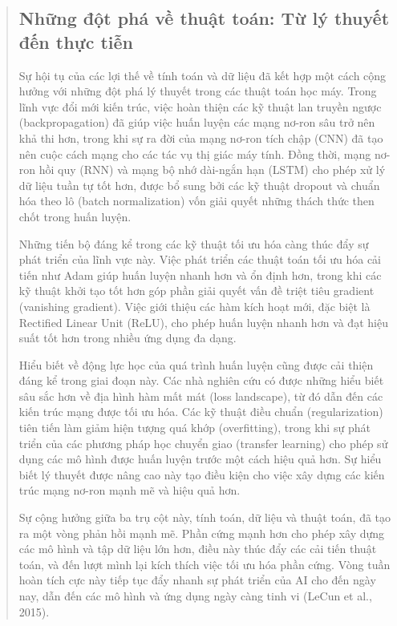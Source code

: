 \begin{quote}
\subsection{Những đột phá về thuật toán: Từ lý thuyết đến thực tiễn}

Sự hội tụ của các lợi thế về tính toán và dữ liệu đã kết hợp một cách cộng hưởng với những đột phá lý thuyết trong các thuật toán học máy. Trong lĩnh vực đổi mới kiến trúc, việc hoàn thiện các kỹ thuật lan truyền ngược (backpropagation) đã giúp việc huấn luyện các mạng nơ-ron sâu trở nên khả thi hơn, trong khi sự ra đời của mạng nơ-ron tích chập (CNN) đã tạo nên cuộc cách mạng cho các tác vụ thị giác máy tính. Đồng thời, mạng nơ-ron hồi quy (RNN) và mạng bộ nhớ dài-ngắn hạn (LSTM) cho phép xử lý dữ liệu tuần tự tốt hơn, được bổ sung bởi các kỹ thuật dropout và chuẩn hóa theo lô (batch normalization) vốn giải quyết những thách thức then chốt trong huấn luyện.

Những tiến bộ đáng kể trong các kỹ thuật tối ưu hóa càng thúc đẩy sự phát triển của lĩnh vực này. Việc phát triển các thuật toán tối ưu hóa cải tiến như Adam giúp huấn luyện nhanh hơn và ổn định hơn, trong khi các kỹ thuật khởi tạo tốt hơn góp phần giải quyết vấn đề triệt tiêu gradient (vanishing gradient). Việc giới thiệu các hàm kích hoạt mới, đặc biệt là Rectified Linear Unit (ReLU), cho phép huấn luyện nhanh hơn và đạt hiệu suất tốt hơn trong nhiều ứng dụng đa dạng.

Hiểu biết về động lực học của quá trình huấn luyện cũng được cải thiện đáng kể trong giai đoạn này. Các nhà nghiên cứu có được những hiểu biết sâu sắc hơn về địa hình hàm mất mát (loss landscape), từ đó dẫn đến các kiến trúc mạng được tối ưu hóa. Các kỹ thuật điều chuẩn (regularization) tiên tiến làm giảm hiện tượng quá khớp (overfitting), trong khi sự phát triển của các phương pháp học chuyển giao (transfer learning) cho phép sử dụng các mô hình được huấn luyện trước một cách hiệu quả hơn. Sự hiểu biết lý thuyết được nâng cao này tạo điều kiện cho việc xây dựng các kiến trúc mạng nơ-ron mạnh mẽ và hiệu quả hơn.

Sự cộng hưởng giữa ba trụ cột này, tính toán, dữ liệu và thuật toán, đã tạo ra một vòng phản hồi mạnh mẽ. Phần cứng mạnh hơn cho phép xây dựng các mô hình và tập dữ liệu lớn hơn, điều này thúc đẩy các cải tiến thuật toán, và đến lượt mình lại kích thích việc tối ưu hóa phần cứng. Vòng tuần hoàn tích cực này tiếp tục đẩy nhanh sự phát triển của AI cho đến ngày nay, dẫn đến các mô hình và ứng dụng ngày càng tinh vi (LeCun et al., 2015).


\end{quote}
